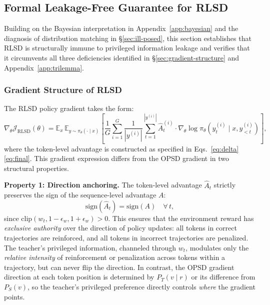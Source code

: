 \documentclass[]{jingdong}
\begin{document}

\subsection{Formal Leakage-Free Guarantee for RLSD}
\label{app:leakage-free}

Building on the Bayesian interpretation in Appendix~\ref{app:bayesian} and the diagnosis of distribution matching in \S\ref{sec:ill-posed}, this section establishes that RLSD is structurally immune to privileged information leakage and verifies that it circumvents all three deficiencies identified in \S\ref{sec:gradient-structure} and Appendix~\ref{app:trilemma}.


\subsubsection{Gradient Structure of RLSD}

The RLSD policy gradient takes the form:
\begin{equation}
    \nabla_\theta \mathcal{J}_{\text{RLSD}}(\theta) = \mathbb{E}_{x}\, \mathbb{E}_{y \sim \pi_\theta(\cdot \mid x)} \left[ \frac{1}{G}\sum_{i=1}^G \frac{1}{|y^{(i)}|}\sum_{t=1}^{|y^{(i)}|} \hat{A}_t^{(i)} \cdot \nabla_\theta \log \pi_\theta(y_t^{(i)} \mid x, y_{<t}^{(i)}) \right],
\end{equation}
where the token-level advantage is constructed as specified in Eqs.~\eqref{eq:delta}\textendash\eqref{eq:final}. This gradient expression differs from the OPSD gradient in two structural properties.

\noindent \textbf{Property 1: Direction anchoring.}
The token-level advantage $\hat{A}_t$ strictly preserves the sign of the sequence-level advantage $A$:
\begin{equation}
    \mathrm{sign}(\hat{A}_t) = \mathrm{sign}(A) \quad \forall\, t,
\end{equation}
since $\mathrm{clip}(w_t, 1 - \epsilon_w, 1 + \epsilon_w) > 0$. This ensures that the environment reward has \textit{exclusive authority} over the direction of policy updates: all tokens in correct trajectories are reinforced, and all tokens in incorrect trajectories are penalized. The teacher's privileged information, channeled through $w_t$, modulates only the \textit{relative intensity} of reinforcement or penalization across tokens within a trajectory, but can never flip the direction. In contrast, the OPSD gradient direction at each token position is determined by $P_T(v \mid r)$ or its difference from $P_S(v)$, so the teacher's privileged preference directly controls \textit{where} the gradient points.
\end{document}
